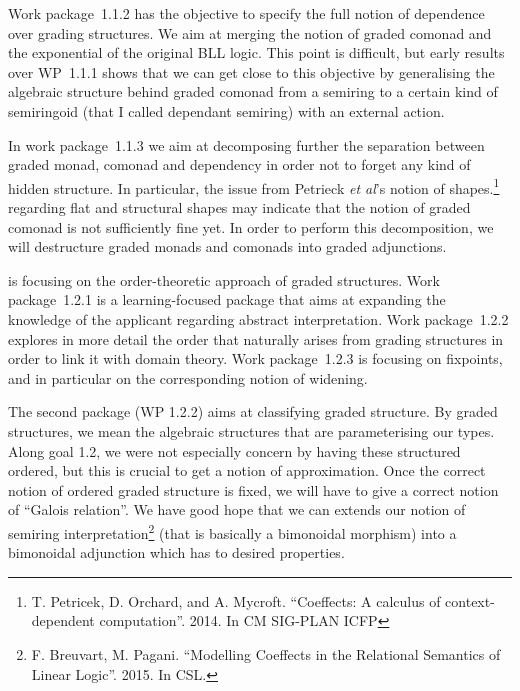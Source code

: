 \documentclass{article}[11pt]
\begin{document}
Work package~1.1.2 has the objective to specify the full notion of dependence over grading structures. We aim at merging the notion of graded comonad and the exponential of the original BLL logic. This point is difficult, but early results over WP~1.1.1 shows that we can get close to this objective by generalising the algebraic structure behind graded comonad from a semiring to a certain kind of semiringoid (that I called dependant semiring) with an external action.

In work package~1.1.3 we aim at decomposing further the separation between graded monad, comonad and dependency in order not to forget any kind of hidden structure. In particular, the issue from Petrieck {\em et al}'s notion of shapes.\footnote{T. Petricek, D. Orchard, and A. Mycroft. ``Coeffects: A calculus of context-dependent computation''. 2014. In CM SIG-PLAN ICFP} regarding flat and structural shapes may indicate that the notion of graded comonad is not sufficiently fine yet. In order to perform this decomposition, we will destructure graded monads and comonads into graded adjunctions.

 is focusing on the order-theoretic approach of graded structures. Work package~1.2.1 is a learning-focused package that aims at expanding the knowledge of the applicant regarding abstract interpretation. %
Work package~1.2.2 explores in more detail the order that naturally arises from grading structures in order to link it with domain theory. Work package~1.2.3 is focusing on fixpoints, and in particular on the corresponding notion of widening.


The second package (WP 1.2.2) aims at classifying graded structure. By graded structures, we mean the algebraic structures that are parameterising our types. Along goal 1.2, we were not especially concern by having these structured ordered, but this is crucial to get a notion of approximation. Once the correct notion of ordered graded structure is fixed, we will have to give a correct notion of ``Galois relation''. We have good hope that we can extends our notion of semiring interpretation\footnote{F. Breuvart, M. Pagani. ``Modelling Coeffects in the Relational Semantics of Linear Logic''. 2015. In CSL.} (that is basically a bimonoidal morphism) into a bimonoidal adjunction which has to desired properties.
\end{document}
